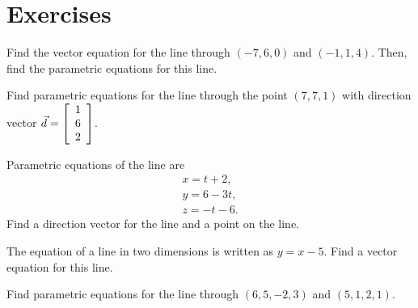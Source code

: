 \documentclass{ximera}
\author{Zack Reed}
\begin{document}
\section*{Exercises}

\begin{exercise}
  Find the vector equation for the line through $(-7,6,0)$ and
  $(-1,1,4)$. Then, find the parametric equations for this
  line.
\end{exercise}

\begin{exercise}
  Find parametric equations for the line through the point
  $(7,7,1)$ with direction vector
  $\vect{d} = \startmat{c} 1 \\ 6 \\ 2 \stopmat$.
\end{exercise}

\begin{exercise}
  Parametric equations of the line are
  \begin{equation*}
    \begin{array}{c}
      x = t+2, \\
      y = 6-3t, \\
      z = -t-6.
    \end{array}
  \end{equation*}
  Find a direction vector for the line and a point on the line.
\end{exercise}

\begin{exercise}
  The equation of a line in two dimensions is written as $y=x-5$. Find
  a vector equation for this line.
\end{exercise}

\begin{exercise}
  Find parametric equations for the line through $(6, 5, -2, 3)$
  and $(5, 1, 2, 1)$.
\end{exercise}
\end{document}
